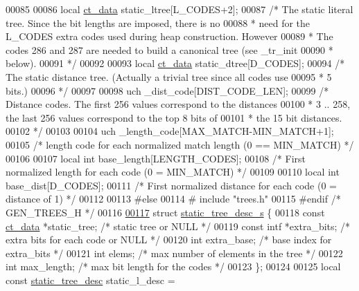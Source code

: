\begin{DoxyCode}
00085 
00086 local \hyperlink{structct__data__s}{ct\_data} static\_ltree[L\_CODES+2];
00087 \textcolor{comment}{/* The static literal tree. Since the bit lengths are imposed, there is no}
00088 \textcolor{comment}{ * need for the L\_CODES extra codes used during heap construction. However}
00089 \textcolor{comment}{ * The codes 286 and 287 are needed to build a canonical tree (see \_tr\_init}
00090 \textcolor{comment}{ * below).}
00091 \textcolor{comment}{ */}
00092 
00093 local \hyperlink{structct__data__s}{ct\_data} static\_dtree[D\_CODES];
00094 \textcolor{comment}{/* The static distance tree. (Actually a trivial tree since all codes use}
00095 \textcolor{comment}{ * 5 bits.)}
00096 \textcolor{comment}{ */}
00097 
00098 uch \_dist\_code[DIST\_CODE\_LEN];
00099 \textcolor{comment}{/* Distance codes. The first 256 values correspond to the distances}
00100 \textcolor{comment}{ * 3 .. 258, the last 256 values correspond to the top 8 bits of}
00101 \textcolor{comment}{ * the 15 bit distances.}
00102 \textcolor{comment}{ */}
00103 
00104 uch \_length\_code[MAX\_MATCH-MIN\_MATCH+1];
00105 \textcolor{comment}{/* length code for each normalized match length (0 == MIN\_MATCH) */}
00106 
00107 local \textcolor{keywordtype}{int} base\_length[LENGTH\_CODES];
00108 \textcolor{comment}{/* First normalized length for each code (0 = MIN\_MATCH) */}
00109 
00110 local \textcolor{keywordtype}{int} base\_dist[D\_CODES];
00111 \textcolor{comment}{/* First normalized distance for each code (0 = distance of 1) */}
00112 
00113 \textcolor{preprocessor}{#else}
00114 \textcolor{preprocessor}{#  include "trees.h"}
00115 \textcolor{preprocessor}{#endif }\textcolor{comment}{/* GEN\_TREES\_H */}\textcolor{preprocessor}{}
00116 
\hyperlink{structstatic__tree__desc__s}{00117} \textcolor{keyword}{struct }\hyperlink{structstatic__tree__desc__s}{static\_tree\_desc\_s} \{
00118     \textcolor{keyword}{const} \hyperlink{structct__data__s}{ct\_data} *static\_tree;  \textcolor{comment}{/* static tree or NULL */}
00119     \textcolor{keyword}{const} intf *extra\_bits;      \textcolor{comment}{/* extra bits for each code or NULL */}
00120     \textcolor{keywordtype}{int}     extra\_base;          \textcolor{comment}{/* base index for extra\_bits */}
00121     \textcolor{keywordtype}{int}     elems;               \textcolor{comment}{/* max number of elements in the tree */}
00122     \textcolor{keywordtype}{int}     max\_length;          \textcolor{comment}{/* max bit length for the codes */}
00123 \};
00124 
00125 local \textcolor{keyword}{const} \hyperlink{structstatic__tree__desc__s}{static\_tree\_desc}  static\_l\_desc =

\end{DoxyCode}
